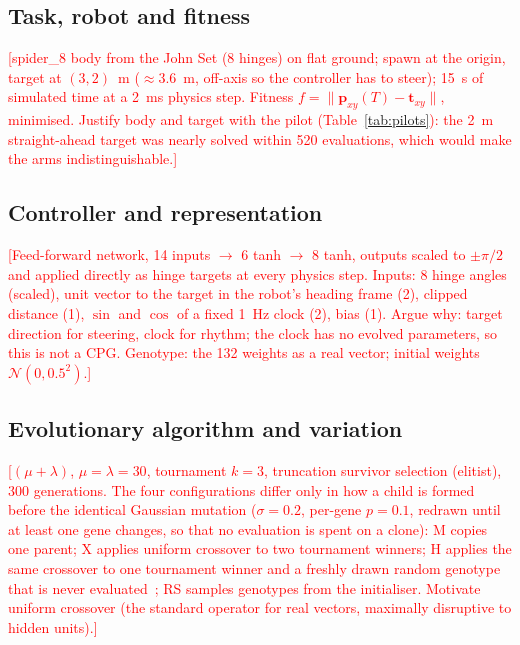 \documentclass[sigconf,nonacm]{acmart}
\newcommand{\todo}[1]{\textcolor{red}{[#1]}}
\newcommand{\cfgM}{\textsf{M}}     %
\newcommand{\cfgX}{\textsf{X}}     %
\newcommand{\cfgH}{\textsf{H}}    %
\newcommand{\cfgRS}{\textsf{RS}}   %
\begin{document}
\subsection{Task, robot and fitness}
\todo{spider\_8 body from the John Set (8 hinges) on flat ground; spawn at the origin, target at $(3, 2)$~m ($\approx 3.6$~m, off-axis so the controller has to steer); 15~s of simulated time at a 2~ms physics step. Fitness $f = \lVert \mathbf{p}_{xy}(T) - \mathbf{t}_{xy} \rVert$, minimised. Justify body and target with the pilot (Table~\ref{tab:pilots}): the 2~m straight-ahead target was nearly solved within 520 evaluations, which would make the arms indistinguishable.}

\subsection{Controller and representation}
\todo{Feed-forward network, 14 inputs $\to$ 6 tanh $\to$ 8 tanh, outputs scaled to $\pm\pi/2$ and applied directly as hinge targets at every physics step. Inputs: 8 hinge angles (scaled), unit vector to the target in the robot's heading frame (2), clipped distance (1), $\sin$ and $\cos$ of a fixed 1~Hz clock (2), bias (1). Argue why: target direction for steering, clock for rhythm; the clock has no evolved parameters, so this is not a CPG. Genotype: the 132 weights as a real vector; initial weights $\mathcal{N}(0, 0.5^2)$.}

\subsection{Evolutionary algorithm and variation}
\label{sec:ea}
\todo{$(\mu+\lambda)$, $\mu = \lambda = 30$, tournament $k = 3$, truncation survivor selection (elitist), 300 generations. The four configurations differ only in how a child is formed before the identical Gaussian mutation ($\sigma = 0.2$, per-gene $p = 0.1$, redrawn until at least one gene changes, so that no evaluation is spent on a clone): \cfgM{} copies one parent; \cfgX{} applies uniform crossover to two tournament winners; \cfgH{} applies the same crossover to one tournament winner and a freshly drawn random genotype that is never evaluated~\cite{jones1995}; \cfgRS{} samples genotypes from the initialiser. Motivate uniform crossover (the standard operator for real vectors, maximally disruptive to hidden units).}
\end{document}
